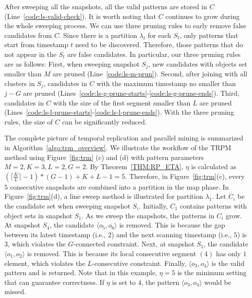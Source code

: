 After sweeping all the snapshots, all the valid patterns are stored in $C$ (Line~\ref{code:ls-valid-check}). 
It is worth noting that $C$ continues to grow during the whole sweeping process. We can use three pruning rules to early remove false candidates from $C$. Since there is a partition $\lambda_t$ for each $S_t$, only patterns that start from timestamp $t$ need to be discovered. Therefore, those patterns that do not appear in the $S_t$ are false candidates. In particular, our
three pruning rules are as follows:
First, when sweeping snapshot $S_j$, new candidates with objects set smaller than $M$ are pruned (Line~\ref{code:ls-m-prun}). Second, after joining with all clusters in $S_j$, 
candidates in $C$ with the maximum timestamp no smaller than $j-G$ are pruned (Lines~\ref{code:ls-g-prune-starts}-\ref{code:ls-g-prune-ends}). Third, candidates in $C$ with the size of the first segment smaller than $L$
are pruned (Lines~\ref{code:ls-l-prune-starts}-\ref{code:ls-l-prune-ends}). With the three pruning rules, the size of $C$ can be significantly reduced.  

The complete picture of temporal replication and parallel mining is summarized in Algorithm~\ref{algo:trm_overview}. We illustrate the workflow of the TRPM method using Figure~\ref{fig:trm} (c) and (d) with pattern
parameters $M=2, K=3, L = 2, G=2$. By Theorem~\ref{THM:RP_ETA}, $\eta$ is calculated
as $(\lceil \frac{K}{L} \rceil-1) *(G-1)+ K + L - 1 = 5$. Therefore, 
in Figure~\ref{fig:trm}(c), every $5$ consecutive snapshots are combined 
into a partition in the map phase. In Figure~\ref{fig:trm}(d), a line sweep
method is illustrated for partition $\lambda_1$. Let $C_i$ be the candidate set when sweeping snapshot $S_i$.
Initially, $C_1$ contains patterns with object sets in snapshot $S_1$.
As we sweep the snapshots, the patterns in $C_i$ grow. At snapshot $S_4$, the candidate
$\langle o_5,o_6 \rangle$ is removed. This is because the gap between its latest timestamp (i.e., $2$)
and the next scanning timestamp (i.e., $5$) is $3$, which violates the $G$-connected constraint.
Next, at snapshot $S_5$, the candidate $\langle o_1,o_2 \rangle$ is removed. This is
because its local consecutive segment $(4)$ has only $1$ element,
which violates the $L$-consecutive constraint.
Finally, $\langle o_3,o_4 \rangle$ is the valid pattern and is returned. Note that in this example, $\eta=5$ is the minimum setting that can guarantee correctness. If $\eta$ is set to $4$, the pattern $\langle o_3,o_4 \rangle$ would be missed. 

